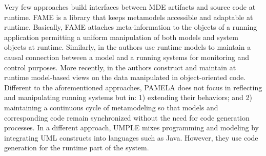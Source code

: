 Very few approaches build interfaces between MDE artifacts and source code at
runtime. FAME \cite{kuhn2008fame} is  a library that keeps metamodels
accessible and adaptable at runtime. Basically, FAME attaches meta-information
to the objects of a running application permitting a uniform manipulation of
both models and system objects at runtime. Similarly, in
\cite{song2010applying} the authors use runtime models to maintain a causal
connection between a model and a running systems for monitoring and control
purposes. More recently, in \cite{boronat2019} the authors construct and
maintain at runtime model-based views on the data manipulated in
object-oriented code. Different to the aforementioned approaches, PAMELA does
not focus in reflecting and manipulating running systems but in: 1) extending
their behaviors; and 2) maintaining a continuous cycle of metamodeling so that
models and corresponding code remain synchronized without the need for code
generation processes. In a different approach, UMPLE
\cite{lethbridge2016merging} mixes programming and modeling by integrating UML
constructs into languages such as Java. However, they use code generation for
the runtime part of the system.
